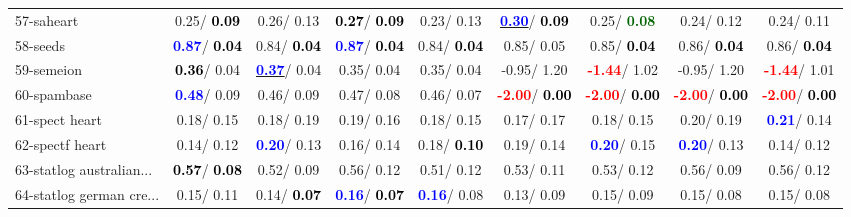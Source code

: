 \begin{table}[h]
\begin{center}
\begin{tabular}{lc|c|c|c|c|c|c|c}
57-saheart &   0.25/\textcolor{black}{\textbf{  0.09}} &   0.26/  0.13 & \textcolor{black}{\textbf{  0.27}}/\textcolor{black}{\textbf{  0.09}} &   0.23/  0.13 & \underline{\textcolor{blue}{\textbf{  0.30}}}/\textcolor{black}{\textbf{  0.09}} &   0.25/\textcolor{darkgreen}{\textbf{  0.08}} &   0.24/  0.12 &   0.24/  0.11 \\
58-seeds & \textcolor{blue}{\textbf{  0.87}}/\textcolor{black}{\textbf{  0.04}} &   0.84/\textcolor{black}{\textbf{  0.04}} & \textcolor{blue}{\textbf{  0.87}}/\textcolor{black}{\textbf{  0.04}} &   0.84/\textcolor{black}{\textbf{  0.04}} &   0.85/  0.05 &   0.85/\textcolor{black}{\textbf{  0.04}} &   0.86/\textcolor{black}{\textbf{  0.04}} &   0.86/\textcolor{black}{\textbf{  0.04}} \\
59-semeion & \textcolor{black}{\textbf{  0.36}}/  0.04 & \underline{\textcolor{blue}{\textbf{  0.37}}}/  0.04 &   0.35/  0.04 &   0.35/  0.04 &  -0.95/  1.20 & \textcolor{red}{\textbf{ -1.44}}/  1.02 &  -0.95/  1.20 & \textcolor{red}{\textbf{ -1.44}}/  1.01 \\
60-spambase & \textcolor{blue}{\textbf{  0.48}}/  0.09 &   0.46/  0.09 &   0.47/  0.08 &   0.46/  0.07 & \textcolor{red}{\textbf{ -2.00}}/\textcolor{black}{\textbf{  0.00}} & \textcolor{red}{\textbf{ -2.00}}/\textcolor{black}{\textbf{  0.00}} & \textcolor{red}{\textbf{ -2.00}}/\textcolor{black}{\textbf{  0.00}} & \textcolor{red}{\textbf{ -2.00}}/\textcolor{black}{\textbf{  0.00}} \\ \hline
61-spect heart &   0.18/  0.15 &   0.18/  0.19 &   0.19/  0.16 &   0.18/  0.15 &   0.17/  0.17 &   0.18/  0.15 &   0.20/  0.19 & \textcolor{blue}{\textbf{  0.21}}/  0.14 \\
62-spectf heart &   0.14/  0.12 & \textcolor{blue}{\textbf{  0.20}}/  0.13 &   0.16/  0.14 &   0.18/\textcolor{black}{\textbf{  0.10}} &   0.19/  0.14 & \textcolor{blue}{\textbf{  0.20}}/  0.15 & \textcolor{blue}{\textbf{  0.20}}/  0.13 &   0.14/  0.12 \\
63-statlog australian... & \textcolor{black}{\textbf{  0.57}}/\textcolor{black}{\textbf{  0.08}} &   0.52/  0.09 &   0.56/  0.12 &   0.51/  0.12 &   0.53/  0.11 &   0.53/  0.12 &   0.56/  0.09 &   0.56/  0.12 \\
64-statlog german cre... &   0.15/  0.11 &   0.14/\textcolor{black}{\textbf{  0.07}} & \textcolor{blue}{\textbf{  0.16}}/\textcolor{black}{\textbf{  0.07}} & \textcolor{blue}{\textbf{  0.16}}/  0.08 &   0.13/  0.09 &   0.15/  0.09 &   0.15/  0.08 &   0.15/  0.08 \\\end{tabular}\label{stratsALCKappa1bIELM}
\end{center}
\end{table}
